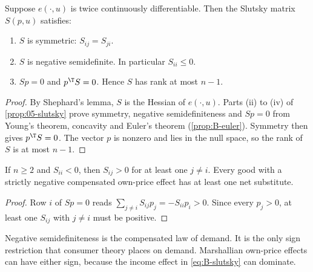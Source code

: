 \begin{proposition}\label{prop:B-slutsky-matrix}
Suppose $e(\cdot, u)$ is twice continuously differentiable. Then the Slutsky matrix $S(p, u)$ satisfies:
\begin{enumerate}[label=(\roman*)]
\item $S$ is symmetric: $S_{ij} = S_{ji}$.
\item $S$ is negative semidefinite. In particular $S_{ii} \leq 0$.
\item $Sp = 0$ and $p^\T S = 0$. Hence $S$ has rank at most $n - 1$.
\end{enumerate}
\end{proposition}

\begin{proof}
By Shephard's lemma, $S$ is the Hessian of $e(\cdot, u)$. Parts (ii) to (iv) of \cref{prop:05-slutsky} prove
symmetry, negative semidefiniteness and $Sp = 0$ from Young's theorem, concavity and Euler's theorem
(\cref{prop:B-euler}). Symmetry then gives $p^\T S = 0$. The vector $p$ is nonzero and lies in the null space,
so the rank of $S$ is at most $n - 1$.
\end{proof}

\begin{corollary}\label{cor:B-net-substitutes}
If $n \geq 2$ and $S_{ii} < 0$, then $S_{ij} > 0$ for at least one $j \neq i$. Every good with a strictly
negative compensated own-price effect has at least one net substitute.
\end{corollary}

\begin{proof}
Row $i$ of $Sp = 0$ reads $\sum_{j \neq i}S_{ij}p_j = -S_{ii}p_i > 0$. Since every $p_j > 0$, at least one
$S_{ij}$ with $j \neq i$ must be positive.
\end{proof}

Negative semidefiniteness is the compensated law of demand. It is the only sign restriction that consumer
theory places on demand. Marshallian own-price effects can have either sign, because the income effect in
\eqref{eq:B-slutsky} can dominate.

